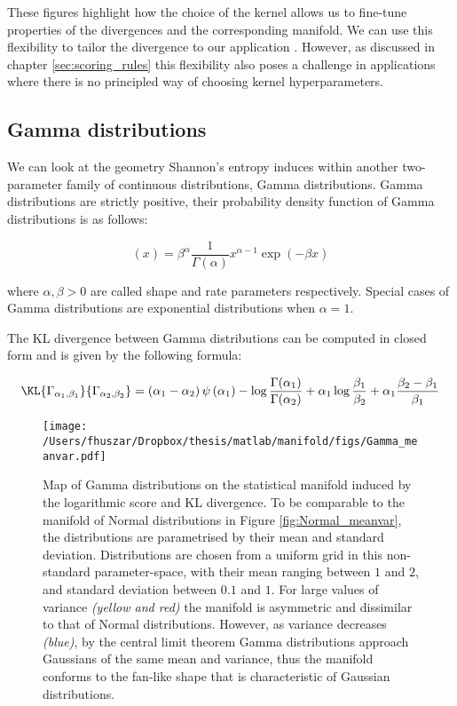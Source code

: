 These figures highlight how the choice of the kernel allows us to fine-tune properties of the divergences and the corresponding manifold. We can use this flexibility to tailor the divergence to our application \citep{tailoring}. However, as discussed in chapter \ref{sec:scoring_rules} this flexibility also poses a challenge in applications where there is no principled way of choosing kernel hyperparameters.

\subsection{Gamma distributions}

We can look at the geometry Shannon's entropy induces within another two-parameter family of continuous distributions, Gamma distributions. Gamma distributions are strictly positive, their probability density function of Gamma distributions is as follows:

\begin{equation}
(x) = \beta^{\alpha}\frac{1}{\Gamma(\alpha)} x^{\alpha-1} \exp(-\beta x)
\end{equation}

where $\alpha,\beta > 0$ are called shape and rate parameters respectively. Special cases of Gamma distributions are exponential distributions when $\alpha=1$.

The KL divergence between Gamma distributions can be computed in closed form and is given by the following formula:

\begin{equation}
	\KL{\Gamma_{\alpha_1,\beta_1}}{\Gamma_{\alpha_2,\beta_2}} = \left(\alpha_1 - \alpha_2\right)\psi\left(\alpha_1\right) - \log\frac{\Gamma(\alpha_1)}{\Gamma(\alpha_2)} + \alpha_1\log\frac{\beta_1}{\beta_2} + \alpha_1\frac{\beta_2 - \beta_1}{\beta_1} \label{Eqn:KL_Gamma}
\end{equation}

\begin{figure} %
	\begin{center}
	\texttt{[image: /Users/fhuszar/Dropbox/thesis/matlab/manifold/figs/Gamma\_meanvar.pdf]}
	\end{center}
	\caption[Map of Gamma distributions using the logarithmic score]{Map of Gamma distributions on the statistical manifold induced by the logarithmic score and KL divergence. To be comparable to the manifold of Normal distributions in Figure \ref{fig:Normal_meanvar}, the distributions are parametrised by their mean and standard deviation. Distributions are chosen from a uniform grid in this non-standard parameter-space, with their mean ranging between $1$ and $2$, and standard deviation between $0.1$ and $1$. For large values of variance \emph{(yellow and red)} the manifold is asymmetric and dissimilar to that of Normal distributions. However, as variance decreases \emph{(blue)}, by the central limit theorem Gamma distributions approach Gaussians of the same mean and variance, thus the manifold conforms to the fan-like shape that is characteristic of Gaussian distributions.}
\end{figure}

